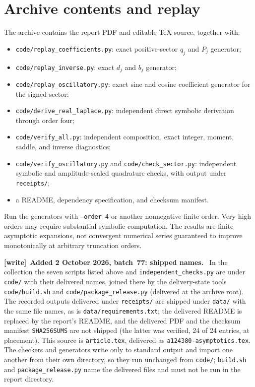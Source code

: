\documentclass[11pt,letterpaper]{article}
\numberwithin{equation}{section}
\newenvironment{writenote}[1][]{\par\smallskip\begingroup\small
 \noindent\textbf{[write]}\if\relax\detokenize{#1}\relax\else~\textbf{#1.}\fi\ }%
 {\par\endgroup\smallskip}
\begin{document}
\section{Archive contents and replay}
The archive contains the report PDF and editable TeX source, together with:
\begin{itemize}
\item \texttt{code/replay\_coefficients.py}: exact positive-sector $q_j$ and $P_j$ generator;
\item \texttt{code/replay\_inverse.py}: exact $d_j$ and $b_j$ generator;
\item \texttt{code/replay\_oscillatory.py}: exact sine and cosine coefficient generator for the signed sector;
\item \texttt{code/derive\_real\_laplace.py}: independent direct symbolic derivation through order four;
\item \texttt{code/verify\_all.py}: independent composition, exact integer, moment, saddle, and inverse diagnostics;
\item \texttt{code/verify\_oscillatory.py} and \texttt{code/check\_sector.py}: independent symbolic and amplitude-scaled quadrature checks, with output under \texttt{receipts/};
\item a README, dependency specification, and checksum manifest.
\end{itemize}
Run the generators with \texttt{--order 4} or another nonnegative finite order. Very high orders may require substantial symbolic computation. The results are finite asymptotic expansions, not convergent numerical series guaranteed to improve monotonically at arbitrary truncation orders.

\begin{writenote}[Added 2 October 2026, batch~77: shipped names]
In the collection the seven scripts listed above and
\nolinkurl{independent_checks.py} are under \nolinkurl{code/} with their
delivered names, joined there by the delivery-state tools
\nolinkurl{code/build.sh} and \nolinkurl{code/package_release.py} (delivered at
the archive root). The recorded outputs delivered under
\nolinkurl{receipts/} are shipped under \nolinkurl{data/} with the same file
names, as is \nolinkurl{data/requirements.txt}; the delivered README is
replaced by the report's README, and the delivered PDF and the checksum
manifest \nolinkurl{SHA256SUMS} are not shipped (the latter was verified,
24 of 24 entries, at placement). This source is \nolinkurl{article.tex},
delivered as \nolinkurl{a124380-asymptotics.tex}. The checkers and
generators write only to standard output and import one another from their
own directory, so they run unchanged from \nolinkurl{code/}; \texttt{build.sh}
and \texttt{package\_release.py} name the delivered files and must not be run
in the report directory.
\end{writenote}
\end{document}
